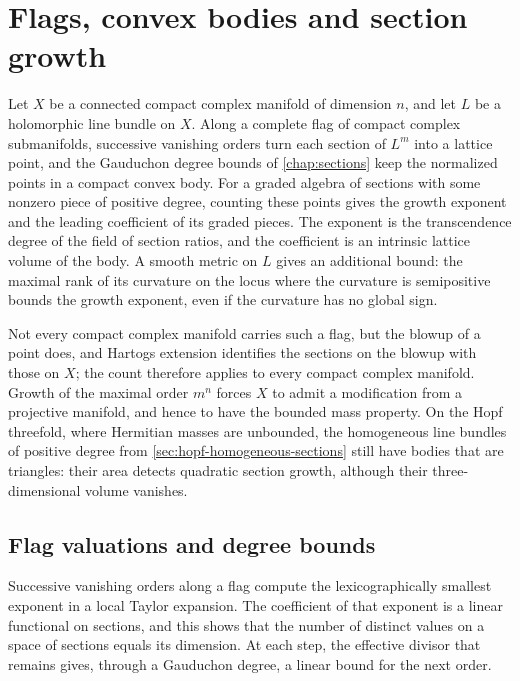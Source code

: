 \chapter{Flags, convex bodies and section growth}
\label{chap:flag-bodies}

Let $X$ be a connected compact complex manifold of dimension $n$, and let $L$ be a holomorphic line bundle on $X$. Along a complete flag of compact complex submanifolds, successive vanishing orders turn each section of $L^m$ into a lattice point, and the Gauduchon degree bounds of \cref{chap:sections} keep the normalized points in a compact convex body. For a graded algebra of sections with some nonzero piece of positive degree, counting these points gives the growth exponent and the leading coefficient of its graded pieces. The exponent is the transcendence degree of the field of section ratios, and the coefficient is an intrinsic lattice volume of the body. A smooth metric on $L$ gives an additional bound: the maximal rank of its curvature on the locus where the curvature is semipositive bounds the growth exponent, even if the curvature has no global sign.

Not every compact complex manifold carries such a flag, but the blowup of a point does, and Hartogs extension identifies the sections on the blowup with those on $X$; the count therefore applies to every compact complex manifold. Growth of the maximal order $m^n$ forces $X$ to admit a modification from a projective manifold, and hence to have the bounded mass property. On the Hopf threefold, where Hermitian masses are unbounded, the homogeneous line bundles of positive degree from \cref{sec:hopf-homogeneous-sections} still have bodies that are triangles: their area detects quadratic section growth, although their three-dimensional volume vanishes.

\section{Flag valuations and degree bounds}\label{sec:compact-flag}

Successive vanishing orders along a flag compute the lexicographically smallest exponent in a local Taylor expansion. The coefficient of that exponent is a linear functional on sections, and this shows that the number of distinct values on a space of sections equals its dimension. At each step, the effective divisor that remains gives, through a Gauduchon degree, a linear bound for the next order.

